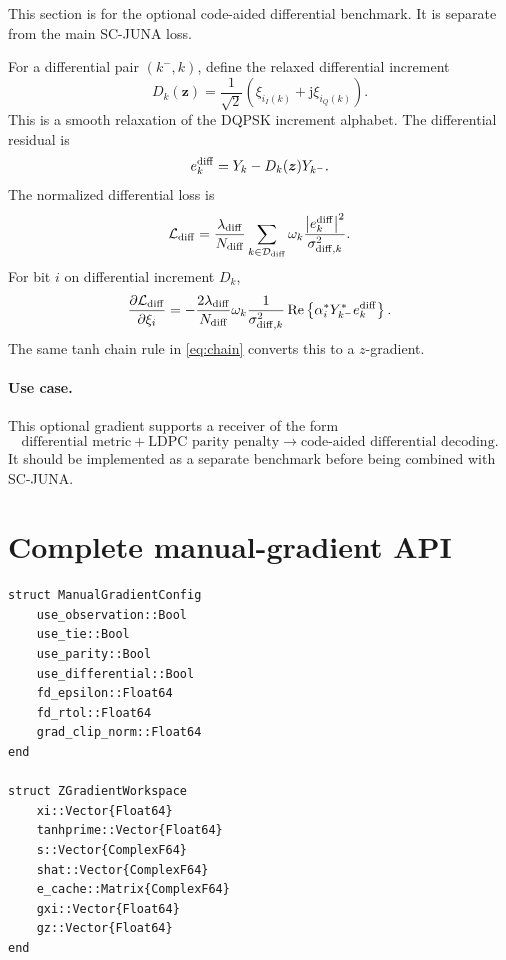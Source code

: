 \documentclass[11pt]{article}
\newcommand{\jj}{\mathrm{j}}
\newcommand{\abs}[1]{\left\lvert #1 \right\rvert}
\newcommand{\re}{\operatorname{Re}}
\begin{document}
This section is for the optional code-aided differential benchmark.  It is separate from the main SC-JUNA loss.

For a differential pair $(k^-,k)$, define the relaxed differential increment
\begin{equation}
D_k(\bm z)=\frac{1}{\sqrt2}\left(\xi_{i_I(k)}+\jj\xi_{i_Q(k)}\right).
\end{equation}
This is a smooth relaxation of the DQPSK increment alphabet.  The differential residual is
\begin{equation}
 e_k^{\rm diff}=Y_k-D_k(\bm z)Y_{k^-}.
\end{equation}
The normalized differential loss is
\begin{equation}
\mathcal L_{\rm diff}
=\frac{\lambda_{\rm diff}}{N_{\rm diff}}
\sum_{k\in\mathcal D_{\rm diff}}
\omega_k\frac{\abs{e_k^{\rm diff}}^2}{\sigma_{{\rm diff},k}^2}.
\end{equation}
For bit $i$ on differential increment $D_k$,
\begin{equation}
\frac{\partial\mathcal L_{\rm diff}}{\partial\xi_i}
= -\frac{2\lambda_{\rm diff}}{N_{\rm diff}}
\omega_k\frac{1}{\sigma_{{\rm diff},k}^2}
\re\left\{\alpha_i^*Y_{k^-}^*e_k^{\rm diff}\right\}.
\label{eq:grad_diff}
\end{equation}
The same tanh chain rule in \eqref{eq:chain} converts this to a $z$-gradient.

\paragraph{Use case.}
This optional gradient supports a receiver of the form
\begin{equation}
\text{differential metric}+\text{LDPC parity penalty}\rightarrow\text{code-aided differential decoding}.
\end{equation}
It should be implemented as a separate benchmark before being combined with SC-JUNA.

\section{Complete manual-gradient API}

\begin{lstlisting}
struct ManualGradientConfig
    use_observation::Bool
    use_tie::Bool
    use_parity::Bool
    use_differential::Bool
    fd_epsilon::Float64
    fd_rtol::Float64
    grad_clip_norm::Float64
end

struct ZGradientWorkspace
    xi::Vector{Float64}
    tanhprime::Vector{Float64}
    s::Vector{ComplexF64}
    shat::Vector{ComplexF64}
    e_cache::Matrix{ComplexF64}
    gxi::Vector{Float64}
    gz::Vector{Float64}
end
\end{lstlisting}
\end{document}
